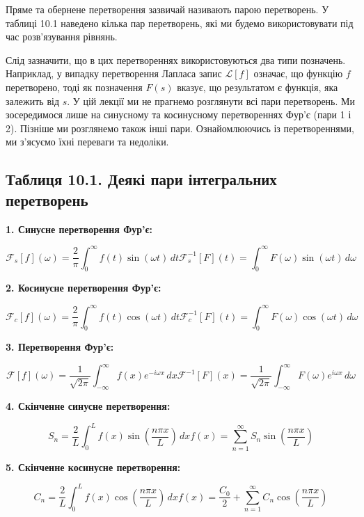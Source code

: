 \documentclass[
  ukrainian,
]{article}
\begin{document}
Пряме та обернене перетворення зазвичай називають парою перетворень. У
таблиці 10.1 наведено кілька пар перетворень, які ми будемо
використовувати під час розв'язування рівнянь.

Слід зазначити, що в цих перетвореннях використовуються два типи
позначень. Наприклад, у випадку перетворення Лапласа запис
\(\mathcal{L}[f]\) означає, що функцію \(f\) перетворено, тоді як
позначення \(F(s)\) вказує, що результатом є функція, яка залежить від
\(s\). У цій лекції ми не прагнемо розглянути всі пари перетворень. Ми
зосередимося лише на синусному та косинусному перетвореннях Фур'є (пари
1 і 2). Пізніше ми розглянемо також інші пари. Ознайомлюючись із
перетвореннями, ми з'ясуємо їхні переваги та недоліки.

\subsection{Таблиця 10.1. Деякі пари інтегральних
перетворень}\label{ux442ux430ux431ux43bux438ux446ux44f-10.1.-ux434ux435ux44fux43aux456-ux43fux430ux440ux438-ux456ux43dux442ux435ux433ux440ux430ux43bux44cux43dux438ux445-ux43fux435ux440ux435ux442ux432ux43eux440ux435ux43dux44c}

\textbf{1. Синусне перетворення Фур'є:}

\[
\mathcal{F}_s[f](\omega) = \frac{2}{\pi}\int_0^\infty f(t)\sin(\omega t)\,dt
\mathcal{F}_s^{-1}[F](t) = \int_0^\infty F(\omega)\sin(\omega t)\,d\omega
\]

\textbf{2. Косинусне перетворення Фур'є:}

\[
\mathcal{F}_c[f](\omega) = \frac{2}{\pi}\int_0^\infty f(t)\cos(\omega t)\,dt
\mathcal{F}_c^{-1}[F](t) = \int_0^\infty F(\omega)\cos(\omega t)\,d\omega
\]

\textbf{3. Перетворення Фур'є:}

\[
\mathcal{F}[f](\omega) = \frac{1}{\sqrt{2\pi}}\int_{-\infty}^{\infty} f(x)e^{-i\omega x}\,dx
\mathcal{F}^{-1}[F](x) = \frac{1}{\sqrt{2\pi}}\int_{-\infty}^{\infty} F(\omega)e^{i\omega x}\,d\omega
\]

\textbf{4. Скінченне синусне перетворення:}

\[
S_n = \frac{2}{L}\int_0^L f(x)\sin\left(\frac{n\pi x}{L}\right)\,dx
f(x) = \sum_{n=1}^{\infty} S_n \sin\left(\frac{n\pi x}{L}\right)
\]

\textbf{5. Скінченне косинусне перетворення:}

\[
C_n = \frac{2}{L}\int_0^L f(x)\cos\left(\frac{n\pi x}{L}\right)\,dx
f(x) = \frac{C_0}{2} + \sum_{n=1}^{\infty} C_n \cos\left(\frac{n\pi x}{L}\right)
\]
\end{document}
